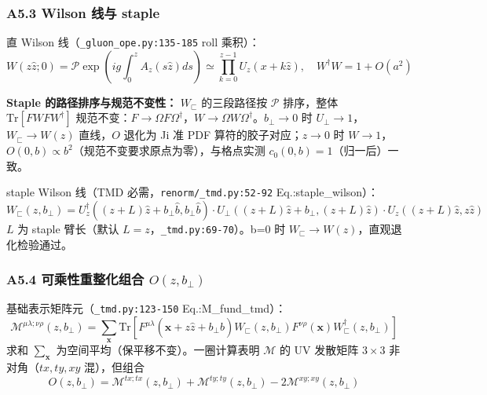 \documentclass[UTF8]{ctexart}
\begin{document}
\subsubsection{A5.3 Wilson 线与 staple}
直 Wilson 线（\texttt{\nolinkurl{\_gluon\_ope.py:135-185}} roll 乘积）：
\begin{equation}
W(z\hat z;0)= \mathcal{P}\exp\left(ig\int_0^z A_z(s\hat z)ds\right)\simeq \prod_{k=0}^{z-1}U_z(x+k\hat z),\quad W^\dagger W=1+O(a^2)
\label{eq:Wline}
\end{equation}

\begin{keybox}
\textbf{Staple 的路径排序与规范不变性：} $W_\sqsubset$ 的三段路径按 $\mathcal{P}$ 排序，整体 $\mathrm{Tr}[F W F W^\dagger]$ 规范不变：$F\to\Omega F\Omega^\dagger$，$W\to\Omega W\Omega^\dagger$。$b_\perp\to0$ 时 $U_\perp\to1$，$W_\sqsubset\to W(z)$ 直线，$O$ 退化为 Ji 准 PDF 算符的胶子对应；$z\to0$ 时 $W\to1$，$O(0,b)\propto b^2$（规范不变要求原点为零），与格点实测 $c_0(0,b)=1$（归一后）一致。
\end{keybox}

staple Wilson 线（TMD 必需，\texttt{\nolinkurl{renorm/\_tmd.py:52-92}} Eq.:staple\_wilson）：
\begin{equation}
W_\sqsubset(z,b_\perp)=U^\dagger_z((z+L)\hat z+b_\perp\hat b,b_\perp\hat b)\cdot U_\perp((z+L)\hat z+b_\perp,(z+L)\hat z)\cdot U_z((z+L)\hat z,z\hat z)
\label{eq:stapleW}
\end{equation}
$L$ 为 staple 臂长（默认 $L=z$，\texttt{\nolinkurl{\_tmd.py:69-70}}）。b=0 时 $W_\sqsubset\to W(z)$，直观退化检验通过。

\subsubsection{A5.4 可乘性重整化组合 $O(z,b_\perp)$}
基础表示矩阵元（\texttt{\nolinkurl{\_tmd.py:123-150}} Eq.:M\_fund\_tmd）：
\begin{equation}
\mathcal{M}^{\mu\lambda;\nu\rho}(z,b_\perp)=\sum_{\mathbf{x}}\mathrm{Tr}\left[F^{\mu\lambda}(\mathbf{x}+z\hat z+b_\perp\hat b)W_\sqsubset(z,b_\perp)F^{\nu\rho}(\mathbf{x})W^\dagger_\sqsubset(z,b_\perp)\right]
\label{eq:Mfund}
\end{equation}
求和 $\sum_{\mathbf{x}}$ 为空间平均（保平移不变）。一圈计算表明 $\mathcal{M}$ 的 UV 发散矩阵 $3\times3$ 非对角（$tx,ty,xy$ 混），但组合
\begin{equation}
O(z,b_\perp)=\mathcal{M}^{tx;tx}(z,b_\perp)+\mathcal{M}^{ty;ty}(z,b_\perp)-2\mathcal{M}^{xy;xy}(z,b_\perp)
\label{eq:Odef}
\end{equation}
\end{document}
